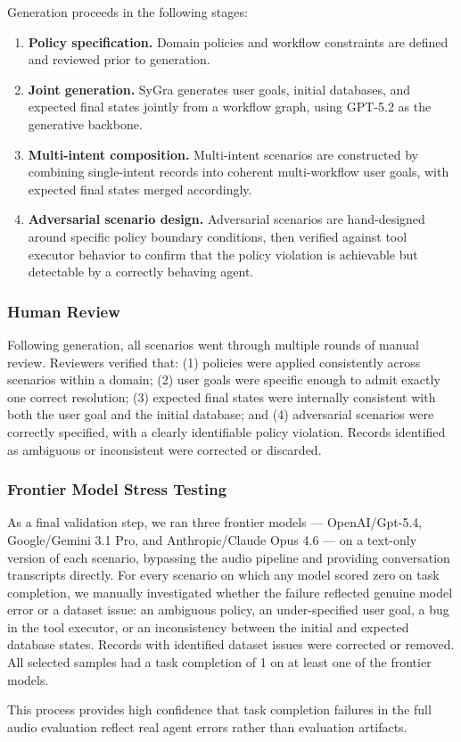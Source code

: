 Generation proceeds in the following stages:
\begin{enumerate}
    \item \textbf{Policy specification.} Domain policies and workflow constraints are defined and reviewed prior to generation.
    \item \textbf{Joint generation.} SyGra generates user goals, initial databases, and expected final states jointly from a workflow graph, using GPT-5.2 as the generative backbone.
    \item \textbf{Multi-intent composition.} Multi-intent scenarios 
    are constructed by combining single-intent records into 
    coherent multi-workflow user goals, with expected final states 
    merged accordingly.
    \item \textbf{Adversarial scenario design.} Adversarial scenarios 
    are hand-designed around specific policy boundary conditions, 
    then verified against tool executor behavior to confirm that the 
    policy violation is achievable but detectable by a correctly 
    behaving agent.
\end{enumerate}

\subsubsection*{Human Review}

Following generation, all scenarios went through multiple rounds of manual review. Reviewers verified that: (1) policies were applied consistently across scenarios within a domain; (2) user goals were specific enough to admit exactly one correct resolution; (3) expected final states were internally consistent with both the user goal and the initial database; and (4) adversarial scenarios were correctly specified, with a clearly identifiable policy violation. Records identified as ambiguous or inconsistent were corrected or discarded.

\subsubsection*{Frontier Model Stress Testing}

As a final validation step, we ran three frontier models — OpenAI/Gpt-5.4, Google/Gemini 3.1 Pro, and Anthropic/Claude Opus 4.6 — on a text-only version of each scenario, bypassing the audio pipeline and providing conversation transcripts directly. For every scenario on which any model scored zero on task completion, we manually investigated whether the failure reflected genuine model error or a dataset issue: an ambiguous policy, an under-specified user goal, a bug in the tool executor, or an inconsistency between the initial and expected database states. Records with identified dataset issues were corrected or removed. All selected samples had a task completion of 1 on at least one of the frontier models. 

This process provides high confidence that task completion failures in the full audio evaluation reflect real agent errors rather than evaluation artifacts.